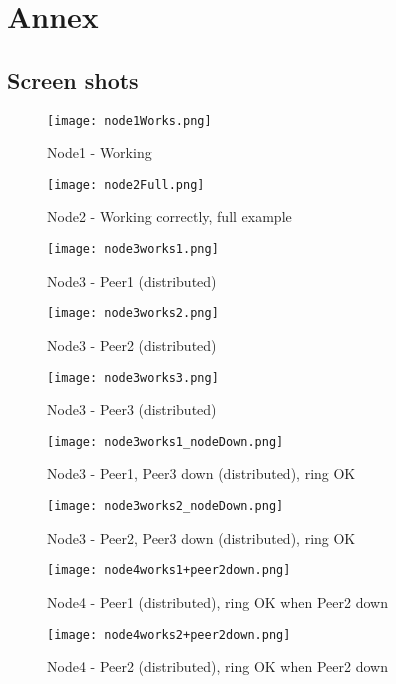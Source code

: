 \section{Annex}
\subsection{Screen shots}

\begin{figure}[h]
\texttt{[image: node1Works.png]}
\centering
\caption{Node1 - Working}
\end{figure}

\begin{figure}[h]
\texttt{[image: node2Full.png]}
\centering
\caption{Node2 - Working correctly, full example}
\end{figure}

\begin{figure}[h]
\texttt{[image: node3works1.png]}
\centering
\caption{Node3 - Peer1 (distributed)}
\end{figure}

\begin{figure}[h]
\texttt{[image: node3works2.png]}
\centering
\caption{Node3 - Peer2 (distributed)}
\end{figure}

\begin{figure}[h]
\texttt{[image: node3works3.png]}
\centering
\caption{Node3 - Peer3 (distributed)}
\end{figure}

\begin{figure}[h]
\texttt{[image: node3works1\_nodeDown.png]}
\centering
\caption{Node3 - Peer1, Peer3 down (distributed), ring OK}
\end{figure}

\begin{figure}[h]
\texttt{[image: node3works2\_nodeDown.png]}
\centering
\caption{Node3 - Peer2, Peer3 down (distributed), ring OK}
\end{figure}

\begin{figure}[h]
\texttt{[image: node4works1+peer2down.png]}
\centering
\caption{Node4 - Peer1 (distributed), ring OK when Peer2 down}
\end{figure}

\begin{figure}[h]
\texttt{[image: node4works2+peer2down.png]}
\centering
\caption{Node4 - Peer2 (distributed), ring OK when Peer2 down}
\end{figure}

